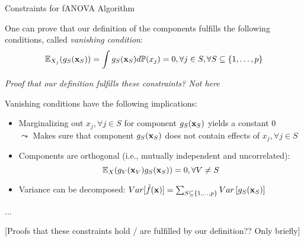 \documentclass[11pt,compress,t,notes=noshow, aspectratio=169, xcolor=table]{beamer}
\begin{document}
\begin{frame}{Constraints for fANOVA Algorithm}

    One can prove that our definition of the components fulfills the following conditions, called \textit{vanishing condition}:
    \begin{equation*}
        \mathbb{E}_{X_j} (g_{S}(\mathbf{x}_S)) = \int g_{S}(\mathbf{x}_S) d \mathbb{P}(x_j) = 0, \forall j \in S, \forall S \subseteq \{1, \ldots, p\}
    \end{equation*}


    \textit{Proof that our definition fulfills these constraints? Not here}
    
    \pause 
    
    Vanishing conditions have the following implications:
    
    \begin{itemize}
        \item Marginalizing out $x_j, \forall j \in S$ for component $g_S(\mathbf{x}_S)$ yields a constant 0\\
        $\leadsto$ Makes sure that component $g_S(\mathbf{x}_S)$ does not contain effects of $x_j, \forall j \in S$
        \item Components are orthogonal (i.e., mutually independent and uncorrelated):
        $$\mathbb{E}_{X} (g_{V}(\mathbf{x}_V) g_{S}(\mathbf{x}_S)) = 0, \forall V \neq S$$
        \item Variance can be decomposed:
    $ Var[\hat{f}(\mathbf{x})] =  \textstyle\sum_{S \subseteq \{1,\ldots,p\}}  Var\left[ g_{S}(\mathbf{x}_S)\right]$
    \end{itemize}
    
\end{frame}

\begin{frame}{...}

    [Proofs that these constraints hold / are fulfilled by our definition?? Only briefly]
    
\end{frame}
\end{document}
